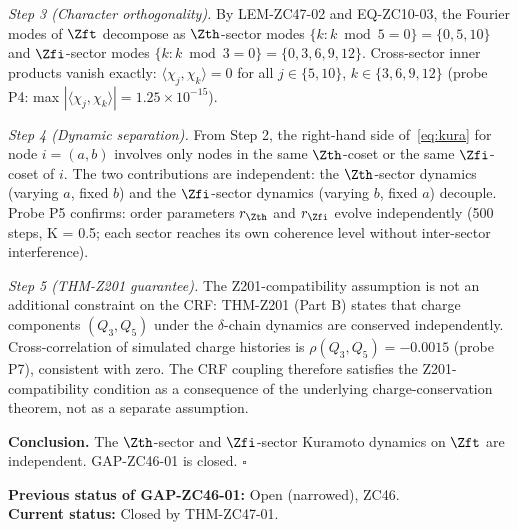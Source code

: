 \documentclass[12pt, a4paper]{article}
\begin{document}
\begin{formalbox}[title={THM-ZC47-01: CRT Sector Decoupling
  (Closes GAP-ZC46-01)}]
\emph{Step 3 (Character orthogonality).}
By LEM-ZC47-02 and EQ-ZC10-03, the Fourier modes of $\Zft$
decompose as $\Zth$-sector modes $\{k : k \bmod 5 = 0\} = \{0,5,10\}$
and $\Zfi$-sector modes $\{k : k \bmod 3 = 0\} = \{0,3,6,9,12\}$.
Cross-sector inner products vanish exactly:
$\langle \chi_j, \chi_k \rangle = 0$ for all
$j \in \{5,10\}$, $k \in \{3,6,9,12\}$
(probe P4: max $|\langle\chi_j,\chi_k\rangle| = 1.25 \times 10^{-15}$).

\emph{Step 4 (Dynamic separation).}
From Step 2, the right-hand side of~\eqref{eq:kura}
for node $i = (a,b)$ involves only nodes in the same $\Zth$-coset
or the same $\Zfi$-coset of $i$.
The two contributions are independent:
the $\Zth$-sector dynamics (varying $a$, fixed $b$) and the
$\Zfi$-sector dynamics (varying $b$, fixed $a$) decouple.
Probe P5 confirms: order parameters $r_{\Zth}$ and $r_{\Zfi}$
evolve independently (500 steps, K = 0.5; each sector reaches
its own coherence level without inter-sector interference).

\emph{Step 5 (THM-Z201 guarantee).}
The Z201-compatibility assumption is not an additional
constraint on the CRF: THM-Z201 (Part B) states that
charge components $(Q_3, Q_5)$ under the $\delta$-chain dynamics
are conserved independently.
Cross-correlation of simulated charge histories is
$\rho(Q_3, Q_5) = -0.0015$ (probe P7), consistent with zero.
The CRF coupling therefore satisfies the Z201-compatibility
condition as a consequence of the underlying charge-conservation
theorem, not as a separate assumption.

\medskip
\textbf{Conclusion.}
The $\Zth$-sector and $\Zfi$-sector Kuramoto dynamics on $\Zft$
are independent.
GAP-ZC46-01 is closed. \hfill$\square$

\textbf{Previous status of GAP-ZC46-01:} Open (narrowed), ZC46.\\
\textbf{Current status:} Closed by THM-ZC47-01.
\end{formalbox}
\end{document}
